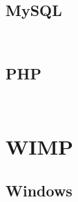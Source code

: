 \begin{lstlisting}[language=bash]

\end{lstlisting}



\begin{lstlisting}[language=bash]

\end{lstlisting}



\section{MySQL}


\begin{lstlisting}[language=bash]

\end{lstlisting}



\begin{lstlisting}[language=bash]

\end{lstlisting}



\section{PHP}


\begin{lstlisting}[language=bash]

\end{lstlisting}



\begin{lstlisting}[language=bash]

\end{lstlisting}


\chapter{WIMP}



\section{Windows}



\begin{lstlisting}[language=bash]

\end{lstlisting}



